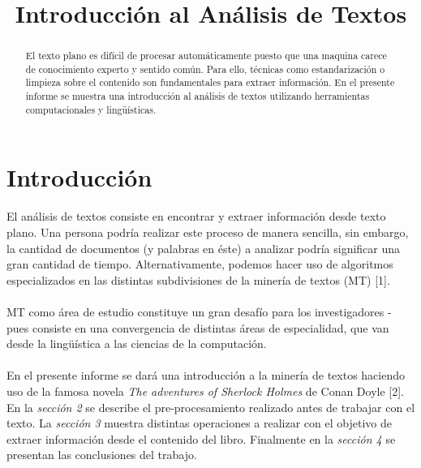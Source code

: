 \documentclass[conference]{IEEEtran}
\begin{document}
\title{Introducción al Análisis de Textos}


\author{
\and
{}
}


\maketitle

\begin{abstract}
El texto plano es difícil de procesar automáticamente puesto que una maquina carece de conocimiento experto y sentido común. Para ello, técnicas como estandarización o limpieza sobre el contenido son fundamentales para extraer información. En el presente informe se muestra una introducción al análisis de textos utilizando herramientas computacionales y lingüísticas.
\end{abstract}
\IEEEpeerreviewmaketitle



\section{Introducción}
El análisis de textos consiste en encontrar y extraer información desde texto plano. Una persona podría realizar este proceso de manera sencilla, sin embargo, la cantidad de documentos (y palabras en éste) a analizar podría significar una gran cantidad de tiempo. Alternativamente, podemos hacer uso de algoritmos especializados en las distintas subdivisiones de la minería de textos (MT) [1].\\\\ MT como área de estudio constituye un gran desafío para los investigadores - pues consiste en una convergencia de distintas áreas de especialidad, que van desde la lingüística a las ciencias de la computación.\\\\En el presente informe se dará una introducción a la minería de textos haciendo uso de la famosa novela \textit{The adventures of Sherlock Holmes} de Conan Doyle [2]. En la \textit{sección 2} se describe el pre-procesamiento realizado antes de trabajar con el texto. La \textit{sección 3} muestra distintas operaciones a realizar con el objetivo de extraer información desde el contenido del libro. Finalmente en la \textit{sección 4} se presentan las conclusiones del trabajo.
\end{document}
